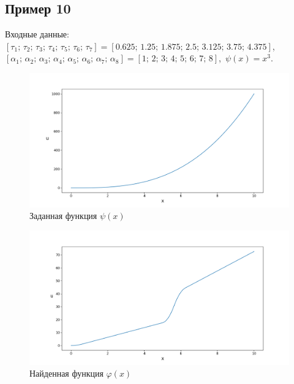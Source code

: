 \documentclass{article}
\theoremstyle{definition}
\begin{document}
\subsection{Пример 10}
Входные данные: \\
$[\tau_1;\, \tau_2;\, \tau_3;\, \tau_4;\, \tau_5;\, \tau_6;\, \tau_7] = 
[0.625;\, 1.25;\, 1.875;\, 2.5;\, 3.125;\, 3.75;\, 4.375]$, \\[1mm]
$[\alpha_1;\, \alpha_2;\, \alpha_3;\, \alpha_4;\, \alpha_5;\, \alpha_6;\, \alpha_7;\, \alpha_8] = 
[1;\, 2;\, 3;\, 4;\, 5;\, 6;\, 7;\, 8]$, 
$\,\psi(x) = x^3$.
\begin{figure}[H]
	\centering
	\includegraphics[trim={2.475cm, 0, 0, 1.5cm}, clip, scale=0.624]{789_psi.png}
	\caption{Заданная функция $\psi(x)$}
	\label{fig:image19}
\end{figure}

\begin{figure}[H]
	\centering
	\includegraphics[trim={2.175cm, 0, 0, 1.5cm}, clip, scale=0.618]{9_u0.png}
	\caption{Найденная функция $\varphi(x)$}
	\label{fig:image20}
\end{figure}

\newpage
\end{document}
